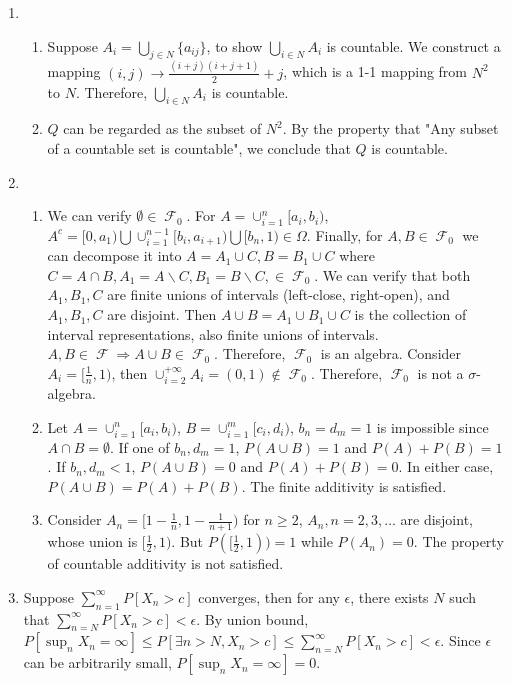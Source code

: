 \documentclass{article}
\DeclareMathOperator{\mF}{\mathcal{F}}
\begin{document}
\courseheader
{}

\begin{enumerate}
\item
\begin{enumerate}
    \item Suppose $A_i = \bigcup_{j \in N} \{a_{ij}\}$, to show
    $\bigcup_{i \in N} A_i$ is countable. We construct a mapping
    $(i,j) \to \frac{(i+j)(i+j+1)}{2} + j$, which is a 1-1 mapping
    from $N^2$ to $N$. Therefore, $\bigcup_{i \in N} A_i$ is countable.
    \item $Q$ can be regarded as the subset of $N^2$. By the property
    that "Any subset of a countable set is countable", we conclude that
    $Q$ is countable.
\end{enumerate}
\item
\begin{enumerate}
    \item We can verify $\emptyset  \in \mF_0$. For
    $A=\cup_{i=1}^n [a_i, b_i)$, $A^c = [0, a_1) \bigcup \cup_{i=1}^{n-1} [b_i, a_{i+1}) \bigcup [b_n, 1) \in \Omega$. Finally, for $A,B \in \mF_0$
    we can decompose it into $A=A_1\cup C, B=B_1 \cup C$ where $C=A\cap B, A_1=A\backslash C, B_1=B\backslash C, \in \mF_0$. We can verify that
    both $A_1, B_1, C$ are finite unions of intervals (left-close, right-open), and $A_1, B_1, C$ are disjoint.
    Then $A\cup B=A_1\cup B_1 \cup C$ is the collection of interval representations, also finite unions of intervals.
    $A, B \in \mF \Rightarrow A\cup B \in \mF_0$. Therefore, $\mF_0$
    is an algebra. Consider $A_i = [\frac{1}{n}, 1)$, then
    $\cup_{i=2}^{+\infty} A_i = (0, 1) \not\in \mF_0$. Therefore,
    $\mF_0$ is not a $\sigma$-algebra.
    \item Let $A=\cup_{i=1}^n [a_i, b_i)$, $B=\cup_{i=1}^m [c_i, d_i)$,
    $b_n=d_m=1$ is impossible since $A \cap B= \emptyset$.
    If one of $b_n, d_m=1$, $P(A\cup B)=1$ and $P(A)+P(B)=1$.
    If $b_n, d_m < 1$, $P(A\cup B)=0$ and $P(A) + P(B)=0$. In either
    case, $P(A\cup B)=P(A)+P(B)$. The finite additivity is satisfied.
    \item Consider $A_n = [1-\frac{1}{n}, 1-\frac{1}{n+1})$ for $n\geq 2$, $A_n, n=2,3,\dots$ are disjoint, whose union is $[\frac{1}{2}, 1)$.
    But $P([\frac{1}{2}, 1)) = 1$ while $P(A_n)=0$. The property of countable additivity is not satisfied.
    \end{enumerate} 
    \item Suppose $\sum_{n=1}^{\infty} P[X_n>c]$ converges, then
    for any $\epsilon$, there exists $N$ such that
    $\sum_{n=N}^{\infty} P[X_n>c] < \epsilon$.
    By union bound,
    $P[\sup_n X_n = \infty] \leq P[\exists n > N, X_n > c] \leq 
    \sum_{n=N}^{\infty} P[X_n>c] < \epsilon$.
    Since $\epsilon$ can be arbitrarily small, $P[\sup_n X_n = \infty]=0$.
    

\end{enumerate}
\end{document}
